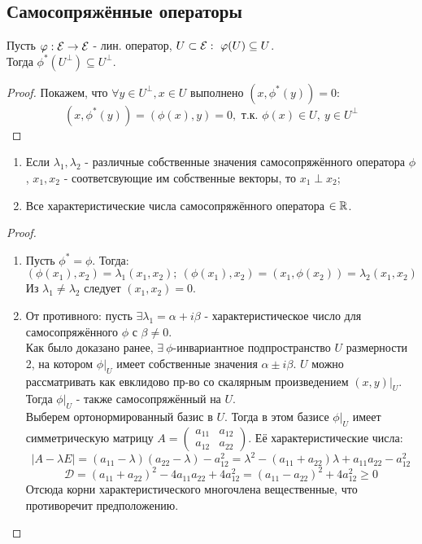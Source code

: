 \subsection{Самосопряжённые операторы}
\begin{lemma}
    Пусть $\varphi: \mathcal{E} \rightarrow \mathcal{E}$ - лин. оператор, $U \subset \mathcal{E}: \ \varphi(U) \subseteq U$.\\
    Тогда $\phi^*(U^\perp) \subseteq U^\perp$.
\end{lemma}
\begin{proof}
    Покажем, что $\forall y \in U^\perp, x \in U$ выполнено $(x, \phi^*(y)) = 0$:
    $$(x, \phi^*(y)) = (\phi(x), y) = 0, \text{ т.к. } \phi(x) \in U, \ y \in U^\perp$$
\end{proof}
\begin{subtheorem} \tab
    \begin{enumerate}
        \item Если $\lambda_1, \lambda_2$ - различные собственные значения самосопряжённого оператора $\phi$, $x_1, x_2$ - соответсвующие им собственные векторы, то $x_1 \perp x_2$;
        \item Все характеристические числа самосопряжённого оператора $\in \mathbb{R}$.
    \end{enumerate}
\end{subtheorem}
\begin{proof} \tab
    \begin{enumerate}
        \item Пусть $\phi^* = \phi$. Тогда:
        $$(\phi(x_1), x_2) = \lambda_1(x_1, x_2); \ (\phi(x_1), x_2) = (x_1, \phi(x_2)) = \lambda_2(x_1, x_2)$$
        Из $\lambda_1 \neq \lambda_2$ следует $(x_1, x_2) = 0$. 
        \item От противного: пусть $\exists \lambda_1 = \alpha + i\beta$ - характеристическое число для самосопряжённого $\phi$ с $\beta \neq 0$.\\
        Как было доказано ранее, $\exists \ \phi$-инвариантное подпространство $U$ размерности 2, на котором $\phi|_U$ имеет собственные значения $\alpha \pm i\beta$.
        $U$ можно рассматривать как евклидово пр-во со скалярным произведением $(x, y)|_U$. Тогда $\phi|_U$ - также самосопряжённый на $U$.\\
        Выберем ортонормированный базис в $U$. Тогда в этом базисе $\phi|_U$ имеет симметрическую матрицу $A = \begin{pmatrix} a_{11}&a_{12} \\ a_{12}&a_{22} \end{pmatrix}$. Её характеристические числа:
        $$|A - \lambda E| = (a_{11} - \lambda)(a_{22} - \lambda) - a_{12}^2 = \lambda^2 - (a_{11} + a_{22})\lambda + a_{11}a_{22} - a_{12}^2$$
        $$\mathcal{D} = (a_{11} + a_{22})^2 - 4a_{11}a_{22} + 4a_{12}^2 = (a_{11} - a_{22})^2 + 4a_{12}^2 \geqslant 0$$
        Отсюда корни характеристического многочлена вещественные, что противоречит предположению.
    \end{enumerate}
\end{proof}
